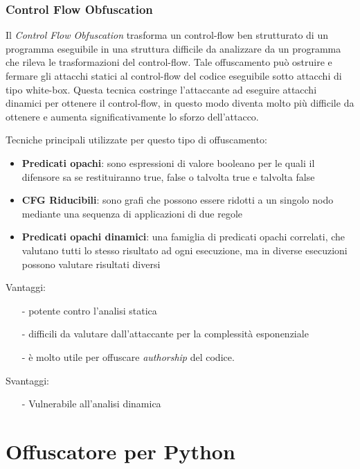 \documentclass[a4paper,oneside,openright,titlepage,10pt,footinclude,headinclude]{scrbook}
\begin{document}
\subsection{Control Flow Obfuscation}
Il \emph{Control Flow Obfuscation} trasforma un control-flow ben strutturato di un programma eseguibile in una struttura difficile da analizzare da un programma che rileva le trasformazioni del control-flow. Tale offuscamento può ostruire e fermare gli attacchi statici al control-flow del codice eseguibile sotto attacchi di tipo white-box. Questa tecnica costringe l'attaccante ad eseguire attacchi dinamici per ottenere il control-flow, in questo modo diventa molto più difficile da ottenere e aumenta significativamente lo sforzo dell'attacco.

\noindent Tecniche principali utilizzate per questo tipo di offuscamento:
\begin{itemize}
\item
\textbf{Predicati opachi}: sono espressioni di valore booleano per le quali il difensore sa se restituiranno true, false o talvolta true e talvolta false
\item
\textbf{CFG Riducibili}: sono grafi che possono essere ridotti a un singolo nodo mediante una sequenza di applicazioni di due regole
\item
\textbf{Predicati opachi dinamici}: una famiglia di predicati opachi correlati, che valutano tutti lo stesso risultato ad ogni esecuzione, ma in diverse esecuzioni possono valutare risultati diversi
\end{itemize}

Vantaggi: 
\begin{itemize}
\item[-]
potente contro l'analisi statica
\item[-]
difficili da valutare dall'attaccante per la complessità esponenziale
\item[-]
è molto utile per offuscare \emph{authorship} del codice.
\end{itemize}

Svantaggi:
\begin{itemize}
\item[-]
Vulnerabile all'analisi dinamica 
\end{itemize}
 

\chapter{Offuscatore per Python}\label{offuscatore}
\end{document}
